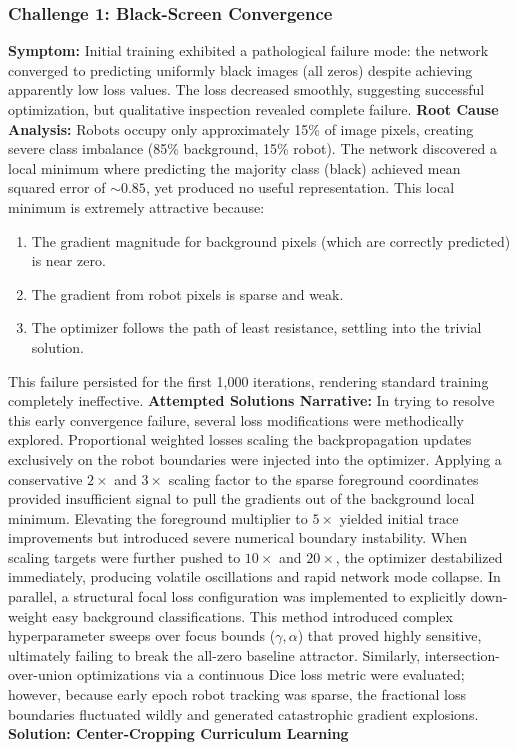 \documentclass[12pt,a4paper,oneside]{report}
\begin{document}
\subsubsection{Challenge 1: Black-Screen Convergence}
\label{subsubsec:challenge_1_black_screen_convergence}
\textbf{Symptom:} Initial training exhibited a pathological failure mode: the network converged to predicting uniformly black images (all zeros) despite achieving apparently low loss values. The loss decreased smoothly, suggesting successful optimization, but qualitative inspection revealed complete failure.
\textbf{Root Cause Analysis:} Robots occupy only approximately 15\% of image pixels, creating severe class imbalance (85\% background, 15\% robot). The network discovered a local minimum where predicting the majority class (black) achieved mean squared error of $\sim 0.85$, yet produced no useful representation. This local minimum is extremely attractive because:
\begin{enumerate}
    \item The gradient magnitude for background pixels (which are correctly predicted) is near zero.
    \item The gradient from robot pixels is sparse and weak.
    \item The optimizer follows the path of least resistance, settling into the trivial solution.
\end{enumerate}

This failure persisted for the first 1,000 iterations, rendering standard training completely ineffective.
\textbf{Attempted Solutions Narrative:} In trying to resolve this early convergence failure, several loss modifications were methodically explored. Proportional weighted losses scaling the backpropagation updates exclusively on the robot boundaries were injected into the optimizer. Applying a conservative $2\times$ and $3\times$ scaling factor to the sparse foreground coordinates provided insufficient signal to pull the gradients out of the background local minimum. Elevating the foreground multiplier to $5\times$ yielded initial trace improvements but introduced severe numerical boundary instability. When scaling targets were further pushed to $10\times$ and $20\times$, the optimizer destabilized immediately, producing volatile oscillations and rapid network mode collapse. In parallel, a structural focal loss configuration was implemented to explicitly down-weight easy background classifications. This method introduced complex hyperparameter sweeps over focus bounds ($\gamma, \alpha$) that proved highly sensitive, ultimately failing to break the all-zero baseline attractor. Similarly, intersection-over-union optimizations via a continuous Dice loss metric were evaluated; however, because early epoch robot tracking was sparse, the fractional loss boundaries fluctuated wildly and generated catastrophic gradient explosions.
\textbf{Solution: Center-Cropping Curriculum Learning}
\end{document}
